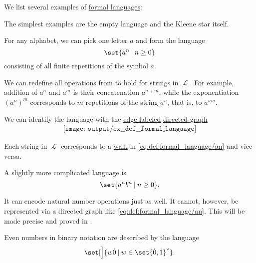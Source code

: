 \begin{example}\label{ex:def:formal_language}
  We list several examples of \hyperref[def:formal_language]{formal languages}:
  \begin{thmenum}
     The simplest examples are the empty language and the Kleene star itself.

     For any alphabet, we can pick one letter \( a \) and form the language
    \begin{equation*}
      \set{ a^n \given n \geq 0 }
    \end{equation*}
    consisting of all finite repetitions of the symbol \( a \).

    We can redefine all operations from  to hold for strings in \( \mscrL \). For example, addition of \( a^n \) and \( a^m \) is their concatenation \( a^{n + m} \), while the exponentiation \( (a^n)^m \) corresponds to \( m \) repetitions of the string \( a^n \), that is, to \( a^{nm} \).

    We can identify the language with the \hyperref[def:labeled_set]{edge-labeled} \hyperref[def:directed_graph]{directed graph}
    \begin{equation}\label{eq:def:formal_language/an}
      \begin{aligned}
        \texttt{[image: output/ex\_\_def\_\_formal\_language]}
      \end{aligned}
    \end{equation}

    Each string in \( \mscrL \) corresponds to a \hyperref[def:graph_walk/directed]{walk} in \eqref{eq:def:formal_language/an} and vice versa.

     A slightly more complicated language is
    \begin{equation*}
      \set{ a^n b^n \given n \geq 0 }.
    \end{equation*}

    It can encode natural number operations just as well. It cannot, however, be represented via a directed graph like \eqref{eq:def:formal_language/an}. This will be made precise and proved in .

     Even numbers in binary notation are described by the language
    \begin{equation*}
      \set[\Big]{ w \syn0 \given w \in \set{ \syn0, \syn1 }^* }.
    \end{equation*}


\end{thmenum}
\end{example}
